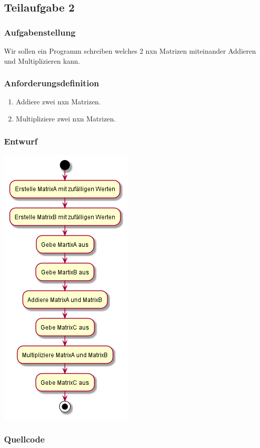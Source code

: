 \subsection{Teilaufgabe 2}
\subsubsection{Aufgabenstellung}
Wir sollen ein Programm schreiben welches 2 nxn Matrizen miteinander Addieren und Multiplizieren kann.

\subsubsection{Anforderungsdefinition}
\begin{enumerate}
	\item Addiere zwei nxn Matrizen.
	\item Multipliziere zwei nxn Matrizen.
\end{enumerate}

\subsubsection{Entwurf}
\includegraphics[scale=0.75]{uml/uml_c4_p2.png}

\subsubsection{Quellcode}

